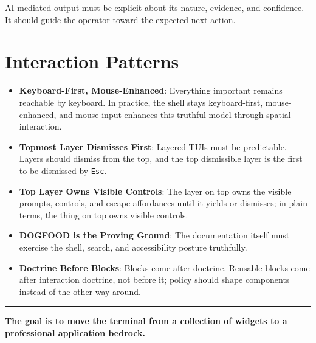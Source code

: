 AI-mediated output must be explicit about its nature, evidence, and confidence. It should guide the operator toward the expected next action.

\section{Interaction Patterns}\label{record-034-interaction-patterns}

\begin{itemize}
\tightlist
\item
  \textbf{Keyboard-First, Mouse-Enhanced}: Everything important remains reachable by keyboard. In practice, the shell stays keyboard-first, mouse-enhanced, and mouse input enhances this truthful model through spatial interaction.
\item
  \textbf{Topmost Layer Dismisses First}: Layered TUIs must be predictable. Layers should dismiss from the top, and the top dismissible layer is the first to be dismissed by \texttt{E\allowbreak{}s\allowbreak{}c}.
\item
  \textbf{Top Layer Owns Visible Controls}: The layer on top owns the visible prompts, controls, and escape affordances until it yields or dismisses; in plain terms, the thing on top owns visible controls.
\item
  \textbf{DOGFOOD is the Proving Ground}: The documentation itself must exercise the shell, search, and accessibility posture truthfully.
\item
  \textbf{Doctrine Before Blocks}: Blocks come after doctrine. Reusable blocks come after interaction doctrine, not before it; policy should shape components instead of the other way around.
\end{itemize}

\begin{center}\rule{0.5\linewidth}{0.5pt}\end{center}

\textbf{The goal is to move the terminal from a collection of widgets to a professional application bedrock.}

